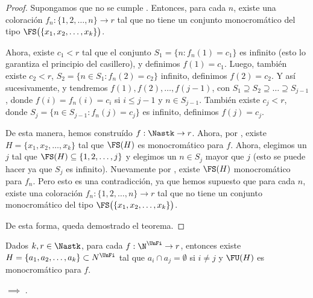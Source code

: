 \begin{proof}
    Supongamos que no se cumple \GSF. Entonces, para cada $n$, existe una coloración $f_n: \{1, 2, \dots, n\} \rightarrow r$ tal que no tiene un conjunto monocromático del tipo $\FS\big(\{x_1, x_2, \dots, x_k\}\big)$.
    
    Ahora, existe $c_1 < r$ tal que el conjunto $S_1 = \{n: f_n(1) = c_1\}$ es infinito (esto lo garantiza el principio del casillero), y definimos $f(1) = c_1$. Luego, también existe $c_2 < r$, $S_2 = \{n \in S_1 : f_n(2) = c_2\}$ infinito, definimos $f(2) = c_2$. Y así sucesivamente, y tendremos $f(1), f(2), \dots, f(j-1)$, con $S_1 \supseteq S_2 \supseteq \dots \supseteq S_{j-1}$, donde $f(i) = f_n(i) = c_i$ si $i \leq j-1$ y $n \in S_{j-1}$. También existe $c_j < r$, donde $S_j = \{n \in S_{j-1} : f_n(j) = c_j\}$ es infinito, definimos $f(j) = c_j$.
    
    De esta manera, hemos construído $f: \Nastk \rightarrow r$. Ahora, por \GS, existe $H = \{x_1, x_2, \dots, x_k\}$ tal que $\FS(H)$ es monocromático para $f$. Ahora, elegimos un $j$ tal que $\FS(H) \subseteq \{1, 2, \dots, j\}$ y elegimos un $n \in S_j$ mayor que $j$ (esto se puede hacer ya que $S_j$ es infinito). Nuevamente por \GS, existe $\FS(H)$ monocromático para $f_n$. Pero esto es una contradicción, ya que hemos supuesto que para cada $n$, existe una coloración $f_n: \{1, 2, \dots, n\} \rightarrow r$ tal que no tiene un conjunto monocromático del tipo $\FS\big(\{x_1, x_2, \dots, x_k\}\big)$.
    
    De esta forma, queda demostrado el teorema.
\end{proof}

\begin{teo}\label{teo:GSC}
    Dados $k, r \in \Nastk$, para cada $f: \N^{\UnFi} \rightarrow r$, entonces existe $H = \{a_1, a_2, \dots, a_k\} \subset N^{\UnFi}$ tal que $a_i \cap a_j = \emptyset$ si $i \neq j$ y $\FU(H)$ es monocromático para $f$.
\end{teo}

\begin{teo}
    \GSF $\implies$ \GSC.
\end{teo}

